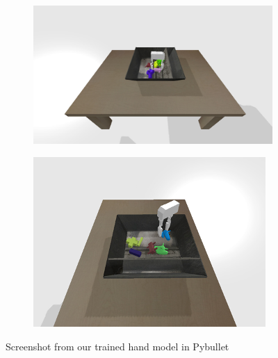 \begin{figure}

    \begin{subfigure}{0.49\textwidth}
      \includegraphics[width=\linewidth]{figures/PybulletEnv1.png}
      \caption{} \label{fig:1a}
    \end{subfigure}%
    \hspace*{\fill}   %
    \begin{subfigure}{0.49\textwidth}
      \includegraphics[width=\linewidth]{figures/PybulletEnv2.png}
      \caption{} \label{fig:1b}
    \end{subfigure}%

\caption{Screenshot from our trained hand model in Pybullet \label{fig:gripperbullet}}
\end{figure}
